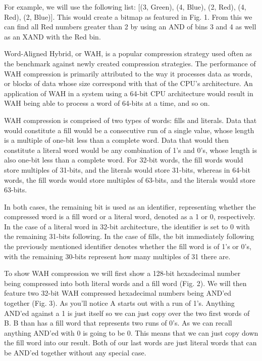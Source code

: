 \documentclass{article}
\begin{document}
For example, we will use the following list: [(3, Green), (4, Blue), (2, Red), (4, Red), (2, Blue)]. 
This would create a bitmap as featured in Fig. 1. From this we can find all Red numbers greater than 2 by using an AND of bins 3 and 4 as well as an XAND with the Red bin. \par


Word-Aligned Hybrid, or WAH, is a popular compression strategy used often as the benchmark against newly created compression strategies. The performance of WAH compression is primarily attributed to the way it processes data as words, or blocks of data whose size correspond with that of the CPU's architecture. An application of WAH in a system using a 64-bit CPU architecture would result in WAH being able to process a word of 64-bits at a time, and so on.
\par 
WAH compression is comprised of two types of words: fills and literals. Data that would constitute a fill would be a consecutive run of a single value, whose length is a multiple of one-bit less than a complete word. Data that would then constitute a literal word would be any combination of 1's and 0's, whose length is also one-bit less than a complete word. For 32-bit words, the fill words would store multiples of 31-bits, and the literals would store 31-bits, whereas in 64-bit words, the fill words would store multiples of 63-bits, and the literals would store 63-bits. 
\par 
In both cases, the remaining bit is used as an identifier, representing whether the compressed word is a fill word or a literal word, denoted as a 1 or 0, respectively. In the case of a literal word in 32-bit architecture, the identifier is set to 0 with the remaining 31-bits following. In the case of fills, the bit immediately following the previously mentioned identifier denotes whether the fill word is of 1’s or 0’s, with the remaining 30-bits represent how many multiples of 31 there are. \par

To show WAH compression we will first show a 128-bit hexadecimal number being compressed into both literal words and a fill word (Fig. 2). We will then feature two 32-bit WAH compressed hexadecimal numbers being AND’ed together (Fig. 3). As you’ll notice A starts out with a run of 1’s. Anything AND’ed against a 1 is just itself so we can just copy over the two first words of B. B than has a fill word that represents two runs of 0’s. As we can recall anything AND’ed with 0 is going to be 0. This means that we can just copy down the fill word into our result. Both of our last words are just literal words that can be AND’ed together without any special case. \par
\end{document}
